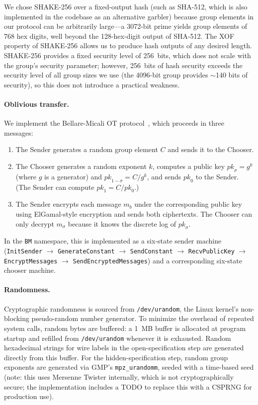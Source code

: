We chose SHAKE-256 over a fixed-output hash (such as SHA-512, which is also implemented in the codebase as an alternative garbler) because group elements in our protocol can be arbitrarily large---a 3072-bit prime yields group elements of 768 hex digits, well beyond the 128-hex-digit output of SHA-512. The XOF property of SHAKE-256 allows us to produce hash outputs of any desired length. SHAKE-256 provides a fixed security level of 256~bits, which does not scale with the group's security parameter; however, 256~bits of hash security exceeds the security level of all group sizes we use (the 4096-bit group provides $\sim$140 bits of security), so this does not introduce a practical weakness.

\paragraph{Oblivious transfer.}
We implement the Bellare-Micali OT protocol~\cite{BM89}, which proceeds in three messages:
\begin{enumerate}
    \item The Sender generates a random group element $C$ and sends it to the Chooser.
    \item The Chooser generates a random exponent $k$, computes a public key $\textit{pk}_\sigma = g^k$ (where $g$ is a generator) and $\textit{pk}_{1-\sigma} = C / g^k$, and sends $\textit{pk}_0$ to the Sender. (The Sender can compute $\textit{pk}_1 = C / \textit{pk}_0$.)
    \item The Sender encrypts each message $m_b$ under the corresponding public key using ElGamal-style encryption and sends both ciphertexts. The Chooser can only decrypt $m_\sigma$ because it knows the discrete log of $\textit{pk}_\sigma$.
\end{enumerate}
In the \texttt{BM} namespace, this is implemented as a six-state sender machine (\texttt{InitSender} $\to$ \texttt{GenerateConstant} $\to$ \texttt{SendConstant} $\to$ \texttt{RecvPublicKey} $\to$ \texttt{EncryptMessages} $\to$ \texttt{SendEncryptedMessages}) and a corresponding six-state chooser machine.

\paragraph{Randomness.}
Cryptographic randomness is sourced from \texttt{/dev/urandom}, the Linux kernel's non-blocking pseudo-random number generator. To minimize the overhead of repeated system calls, random bytes are buffered: a 1~MB buffer is allocated at program startup and refilled from \texttt{/dev/urandom} whenever it is exhausted. Random hexadecimal strings for wire labels in the open-specification step are generated directly from this buffer. For the hidden-specification step, random group exponents are generated via GMP's \texttt{mpz\_urandomm}, seeded with a time-based seed (note: this uses Mersenne Twister internally, which is not cryptographically secure; the implementation includes a TODO to replace this with a CSPRNG for production use).


